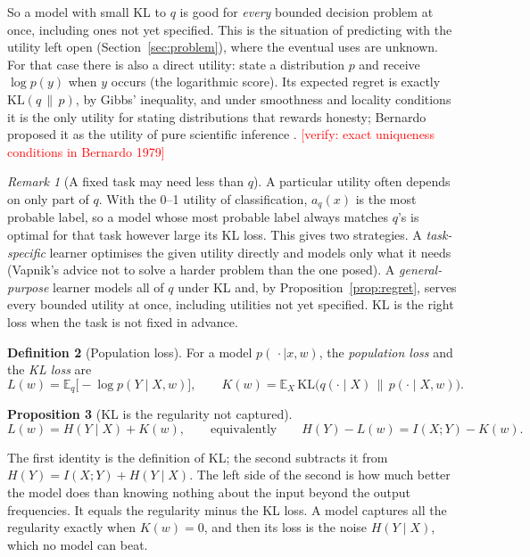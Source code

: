 \documentclass[11pt]{article}
\theoremstyle{definition}
\newtheorem{definition}{Definition}[section]
\theoremstyle{plain}
\newtheorem{proposition}[definition]{Proposition}
\theoremstyle{remark}
\newtheorem{remark}[definition]{Remark}
\newcommand{\verify}[1]{\textcolor{red}{[verify: #1]}}
\newcommand{\E}{\mathbb{E}}
\newcommand{\KL}{\mathrm{KL}}
\begin{document}
So a model with small KL to $q$ is good for \emph{every} bounded
decision problem at once, including ones not yet specified. This is the
situation of predicting with the utility left open
(Section~\ref{sec:problem}), where the eventual uses are unknown. For
that case there is also a direct utility: state a distribution $p$ and
receive $\log p(y)$ when $y$ occurs (the logarithmic score). Its
expected regret is exactly $\KL(q\,\|\,p)$, by Gibbs' inequality, and
under smoothness and locality conditions it is the only utility for
stating distributions that rewards honesty; Bernardo proposed it as the
utility of pure scientific inference \cite{bernardo1979}. \verify{exact uniqueness
conditions in Bernardo 1979}

\begin{remark}[A fixed task may need less than $q$]
A particular utility often depends on only part of $q$. With the 0--1
utility of classification, $a_q(x)$ is the most probable label, so a
model whose most probable label always matches $q$'s is optimal for
that task however large its KL loss. This gives two strategies. A
\emph{task-specific} learner optimises the given utility directly and
models only what it needs (Vapnik's advice not to solve a harder
problem than the one posed). A \emph{general-purpose} learner models
all of $q$ under KL and, by Proposition~\ref{prop:regret}, serves every
bounded utility at once, including utilities not yet specified. KL is
the right loss when the task is not fixed in advance.
\end{remark}

\begin{definition}[Population loss]
For a model $p(\,\cdot\mid x,w)$, the \emph{population loss} and the
\emph{KL loss} are
\[
L(w) = \E_q\big[-\log p(Y\mid X,w)\big], \qquad
K(w) = \E_X\,\KL\big(q(\cdot\mid X)\,\|\,p(\cdot\mid X,w)\big).
\]
\end{definition}

\begin{proposition}[KL is the regularity not captured]
\[
L(w) = H(Y\mid X) + K(w), \qquad\text{equivalently}\qquad
H(Y) - L(w) = I(X;Y) - K(w).
\]
\end{proposition}
\noindent The first identity is the definition of KL; the second
subtracts it from $H(Y)=I(X;Y)+H(Y\mid X)$. The left side of the second
is how much better the model does than knowing nothing about the input
beyond the output frequencies. It equals the regularity minus the KL
loss. A model captures all the regularity exactly when $K(w)=0$, and
then its loss is the noise $H(Y\mid X)$, which no model can beat.
\end{document}
